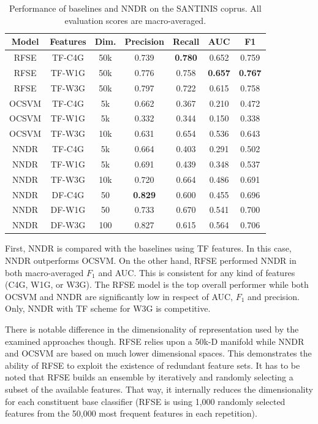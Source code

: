 \begin{table}[t]
\center
\caption {Performance of baselines and NNDR on the SANTINIS coprus. All evaluation scores are macro-averaged.}
\label{chap:word_embeddings:tbl:NNDR_RFSE_OCSVME_final}
\begin{tabular}{ccccccc}
\hline
Model & Features & Dim. & Precision & Recall & AUC & F1 \\
\hline
RFSE & TF-C4G & 50k & 0.739 & \textbf{0.780} & 0.652 & 0.759 \\
RFSE & TF-W1G & 50k & 0.776 & 0.758 & \textbf{0.657} & \textbf{0.767} \\
RFSE & TF-W3G & 50k & 0.797 & 0.722 & 0.615 & 0.758 \\
OCSVM & TF-C4G & 5k & 0.662 & 0.367 & 0.210 & 0.472\\
OCSVM & TF-W1G & 5k & 0.332 & 0.344 & 0.150 & 0.338\\
OCSVM & TF-W3G & 10k & 0.631 & 0.654 & 0.536 & 0.643\\
NNDR & TF-C4G & 5k & 0.664 & 0.403 & 0.291 & 0.502 \\
NNDR & TF-W1G & 5k & 0.691 & 0.439 & 0.348 & 0.537 \\
NNDR & TF-W3G & 10k & 0.720 & 0.664 & 0.486 & 0.691 \\
NNDR & DF-C4G & 50 & \textbf{0.829} & 0.600 & 0.455 & 0.696 \\
NNDR & DF-W1G & 50 & 0.733 & 0.670 & 0.541 & 0.700 \\
NNDR & DF-W3G & 100 & 0.827 & 0.615 & 0.564 & 0.706 \\
\hline
\end{tabular}
\end{table}

First, NNDR is compared with the baselines using TF features. In this case, NNDR outperforms OCSVM. On the other hand, RFSE performed NNDR in both macro-averaged $F_1$ and AUC. This is consistent for any kind of features (C4G, W1G, or W3G). The RFSE model is the top overall performer while both OCSVM and NNDR are significantly low in respect of AUC, $F_1$ and precision. Only, NNDR with TF scheme for W3G is competitive. 

There is notable difference in the dimensionality of representation used by the examined approaches though. RFSE relies upon a 50k-D manifold while NNDR and OCSVM are based on much lower dimensional spaces. This demonstrates the ability of RFSE to exploit the existence of redundant feature sets. It has to be noted that RFSE builds an ensemble by iteratively and randomly selecting a subset of the available features. That way, it internally reduces the dimensionality for each constituent base classifier (RFSE is using 1,000 randomly selected features from the 50,000 most frequent features in each repetition). 

